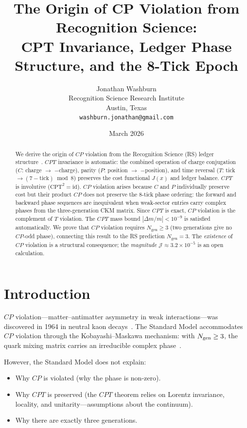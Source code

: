 \documentclass[12pt,a4paper]{article}
\title{The Origin of CP Violation from Recognition Science:\\
CPT Invariance, Ledger Phase Structure, and the 8-Tick Epoch}
\author{Jonathan Washburn\\
Recognition Science Research Institute\\
Austin, Texas\\
\texttt{washburn.jonathan@gmail.com}}
\date{March 2026}
\theoremstyle{definition}
\theoremstyle{remark}
\begin{document}
\maketitle

\begin{abstract}
We derive the origin of $CP$ violation from the Recognition
Science (RS) ledger structure~\cite{RS_Axioms}.  $CPT$ invariance is automatic:
the combined operation of charge conjugation ($C$: charge $\to$
$-$charge), parity ($P$: position $\to$ $-$position), and time
reversal ($T$: tick $\to (7 - \mathrm{tick}) \bmod 8$) preserves
the cost functional $J(x)$ and ledger balance.  $CPT$ is
involutive ($\mathrm{CPT}^2 = \mathrm{id}$).  $CP$ violation
arises because $C$ and $P$ individually preserve cost but their
product $CP$ does not preserve the 8-tick phase ordering: the
forward and backward phase sequences are inequivalent when
weak-sector entries carry complex phases from the three-generation
CKM matrix.  Since $CPT$ is exact, $CP$ violation is the
complement of $T$ violation.  The $CPT$ mass bound
$|\Delta m/m| < 10^{-9}$ is satisfied automatically.  We prove
that $CP$ violation requires $N_{\mathrm{gen}} \geq 3$ (two
generations give no $CP$-odd phase), connecting this result to the
RS prediction $N_{\mathrm{gen}} = 3$.  The \emph{existence} of $CP$
violation is a structural consequence; the \emph{magnitude}
$\mathcal{J} \approx 3.2 \times 10^{-5}$ is an open calculation.
\end{abstract}

\section{Introduction}
\label{sec:intro}

$CP$ violation---matter--antimatter asymmetry in weak interactions---was
discovered in 1964 in neutral kaon decays~\cite{Christenson1964}.
The Standard Model accommodates $CP$ violation through the
Kobayashi--Maskawa mechanism: with $N_{\rm gen} \geq 3$, the quark
mixing matrix carries an irreducible complex phase~\cite{KM1973}.

However, the Standard Model does not explain:
\begin{itemize}
  \item Why $CP$ is violated (why the phase is non-zero).
  \item Why $CPT$ is preserved (the $CPT$ theorem relies on
  Lorentz invariance, locality, and unitarity---assumptions
  about the continuum).
  \item Why there are exactly three generations.
\end{itemize}
\end{document}
